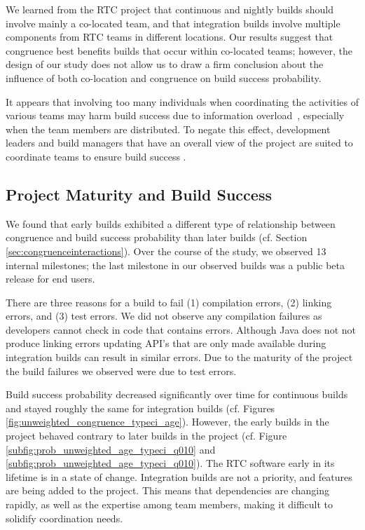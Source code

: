 We learned from the RTC project that continuous and nightly builds should involve mainly a co-located team, and that integration builds involve multiple components from RTC teams in different locations. Our results suggest that congruence best benefits builds that occur within co-located teams; however, the design of our study does not allow us to draw a firm conclusion about the influence of both co-location and congruence on build success probability.

It appears that involving too many individuals when coordinating the activities of various teams may harm build success due to information overload~\cite{damian:icgse:2007}, especially when the team members are distributed. To negate this effect, development leaders and build managers that have an overall view of the project are suited to coordinate teams to ensure build success \cite{hinds:cscw:2006}.


\subsection{Project Maturity and Build Success}
We found that early builds exhibited a different type of relationship between congruence and build success probability than later builds (cf. Section \ref{sec:congruenceinteractions}). Over the course of the study, we observed 13 internal milestones; the last milestone in our observed builds was a public beta release for end users.

There are three reasons for a build to fail (1) compilation errors, (2) linking errors, and (3) test errors.
We did not observe any compilation failures as developers cannot check in code that contains errors.
Although Java does not not produce linking errors updating API's that are only made available during integration builds can result in similar errors.
Due to the maturity of the project the build failures we observed were due to test errors.

Build success probability decreased significantly over time for continuous builds and stayed roughly the same for integration builds (cf. Figures \ref{fig:unweighted_congruence_typeci_age}).
However, the early builds in the project behaved contrary to later builds in the project (cf. Figure \ref{subfig:prob_unweighted_age_typeci_q010} and \ref{subfig:prob_unweighted_age_typeci_q010}). The RTC software early in its lifetime is in a state of change. Integration builds are not a priority, and features are being added to the project. This means that dependencies are changing rapidly, as well as the expertise among team members, making it difficult to solidify coordination needs.

